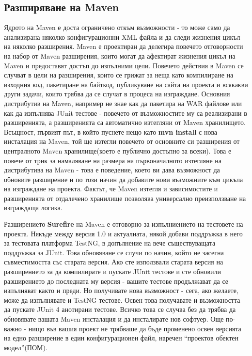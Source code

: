\subsection{Разширяване на Maven}
Ядрото на Maven е доста ограничено откъм възможности - то може само да
анализирана няколко конфигурационни XML файла и да следи жизнения
цикъл на няколко разширения. Maven е проектиран да делегира повечето
отговорности на набор от Maven разширения, които могат да афектират
жизнения цикъл на Maven и предоставят достъп до изпълними
цели. Повечето действия в Maven се случват в цели на разширения, които
се грижат за неща като компилиране на изходния код, пакетиране на
байткод, публикуване на сайта на проекта и всякакви други задачи,
които трябва да се случат в процеса на изграждане. Основния
дистрибутив на Maven, например не знае как да пакетира на WAR файлове
или как да изпълнява JUnit тестове - повечето от възможностите му са
реализирани в разширенията, а разширенията са автоматично изтегляни от
Maven хранилището. Всъщност, първият път, в който пуснете нещо като
\textbf{mvn install} с нова инсталация на Maven, той ще изтегли
повечето от основните си разширения от централното Maven
хранилище(което е публично достъпно за всеки). Това е повече от трик
за намаляване на размера на първоначалното изтегляне на дистрибутива
на Maven - това е поведение, което ви дава възможност да обновите
разширение и по този начин да добавите нови възможните към цикъла на
изграждане на проекта. Фактът, че Maven изтегля и зависимостите и
разширенията от отдалечено хранилище позволява универсално
преизползване на изграждаща логика.

Разширението \textbf{Surefire} на Maven е отговорно за изпълниението
на тестовете на проекта. Някъде между версия 1.0 и актуалната, някой
добави поддръжка в него за тестовата платформа TestNG, в допълнение на
вече съществуващата поддръжка за JUnit. Това обновяване се случи по
начин, който не засегна съвместимостта със старата версия. Ако сте
използвали старата версия на разширението за да компилирате и пускате
JUnit тестове и сте обновили разширението до последната му версия -
вашите тестове продължават да се изпълняват както и преди. Но
получивате нова възможност - сега, ако желаете, може да изпълнявате и
TestNG тестове. Освен това получавате и възможността да пускате JUnit
4 анотирани тестове. Всичко това се случва без да трябва да обновявате
вашата Maven инсталация и да инсталирате нов софтуер. Още по-важно -
нищо във вашия проект не трябваше да бъде променено освен версията на
едно разширение в един конфигурационен файл, наречен "`проектов
обектен модел"'(ПОМ).

